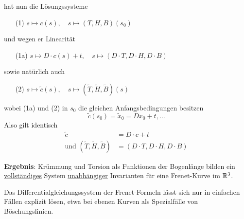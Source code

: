 \begin{beweis}
\begin{enumerate}
\[ \]
 hat nun die Lösungssysteme
 \begin{enumerate}
  \item[(1)] \(s \mapsto c(s), \quad s \mapsto (T, H, B)(s_0)\)
  \end{enumerate}
  und wegen er Linearität
  \begin{enumerate}
  \item[(1a)] \(s \mapsto D \cdot c(s) + t, \quad s \mapsto (D \cdot T, D \cdot H, D \cdot B)\)
  \end{enumerate}
  sowie natürlich auch
  \begin{enumerate}
  \item[(2)] \(s \mapsto \widetilde c(s), \quad s \mapsto \left(\widetilde T, \widetilde H, \widetilde B\right)(s)\) \\
 \end{enumerate}
 wobei (1a) und (2) in \(s_0\) die gleichen Anfangsbedingungen besitzen
 \[
  \widetilde c(s_0) = \widetilde x_0 = D x_0 + t, \dots
 \]
Also gilt identisch
\begin{align*}
 \widetilde c &= D \cdot c + t \\
 \text{und } \left(\widetilde T, \widetilde H, \widetilde B\right) &= (D \cdot T, D \cdot H, D \cdot B)
\end{align*}

 \end{enumerate}
\end{beweis}

\textbf{Ergebnis}: Krümmung und Torsion als Funktionen der Bogenlänge bilden ein \uline{vollständiges} Sys\-tem \uline{unabhängiger} Invarianten für eine Frenet-Kurve im \(\mathbb{R}^3\).

\begin{bemerkung}
 Das Differentialgleichungssystem der Frenet-Formeln lässt sich nur in einfachen Fällen explizit lösen, etwa bei ebenen Kurven als Spezialfälle von Böschungslinien.
\end{bemerkung}

